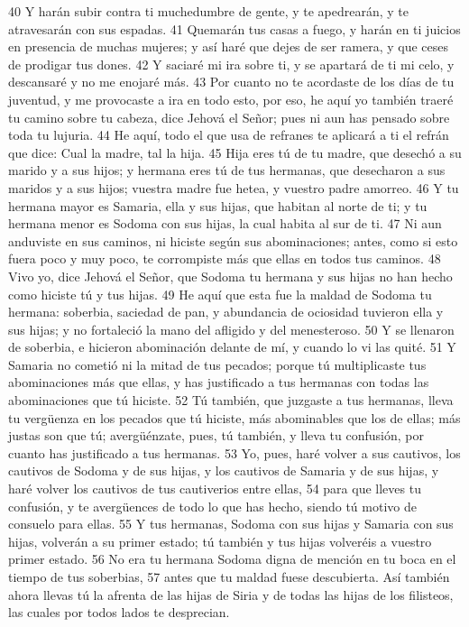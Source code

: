 40 Y harán subir contra ti muchedumbre de gente, y te apedrearán, y te atravesarán con sus espadas.
41 Quemarán tus casas a fuego, y harán en ti juicios en presencia de muchas mujeres; y así haré que dejes de ser ramera, y que ceses de prodigar tus dones.
42 Y saciaré mi ira sobre ti, y se apartará de ti mi celo, y descansaré y no me enojaré más.
43 Por cuanto no te acordaste de los días de tu juventud, y me provocaste a ira en todo esto, por eso, he aquí yo también traeré tu camino sobre tu cabeza, dice Jehová el Señor; pues ni aun has pensado sobre toda tu lujuria.
44 He aquí, todo el que usa de refranes te aplicará a ti el refrán que dice: Cual la madre, tal la hija.
45 Hija eres tú de tu madre, que desechó a su marido y a sus hijos; y hermana eres tú de tus hermanas, que desecharon a sus maridos y a sus hijos; vuestra madre fue hetea, y vuestro padre amorreo.
46 Y tu hermana mayor es Samaria, ella y sus hijas, que habitan al norte de ti; y tu hermana menor es Sodoma con sus hijas, la cual habita al sur de ti.
47 Ni aun anduviste en sus caminos, ni hiciste según sus abominaciones; antes, como si esto fuera poco y muy poco, te corrompiste más que ellas en todos tus caminos.
48 Vivo yo, dice Jehová el Señor, que Sodoma tu hermana y sus hijas no han hecho como hiciste tú y tus hijas.
49 He aquí que esta fue la maldad de Sodoma tu hermana: soberbia, saciedad de pan, y abundancia de ociosidad tuvieron ella y sus hijas; y no fortaleció la mano del afligido y del menesteroso.
50 Y se llenaron de soberbia, e hicieron abominación delante de mí, y cuando lo vi las quité.
51 Y Samaria no cometió ni la mitad de tus pecados; porque tú multiplicaste tus abominaciones más que ellas, y has justificado a tus hermanas con todas las abominaciones que tú hiciste. 
52 Tú también, que juzgaste a tus hermanas, lleva tu vergüenza en los pecados que tú hiciste, más abominables que los de ellas; más justas son que tú; avergüénzate, pues, tú también, y lleva tu confusión, por cuanto has justificado a tus hermanas.
53 Yo, pues, haré volver a sus cautivos, los cautivos de Sodoma y de sus hijas, y los cautivos de Samaria y de sus hijas, y haré volver los cautivos de tus cautiverios entre ellas,
54 para que lleves tu confusión, y te avergüences de todo lo que has hecho, siendo tú motivo de consuelo para ellas.
55 Y tus hermanas, Sodoma con sus hijas y Samaria con sus hijas, volverán a su primer estado; tú también y tus hijas volveréis a vuestro primer estado.
56 No era tu hermana Sodoma digna de mención en tu boca en el tiempo de tus soberbias,
57 antes que tu maldad fuese descubierta. Así también ahora llevas tú la afrenta de las hijas de Siria y de todas las hijas de los filisteos, las cuales por todos lados te desprecian.
